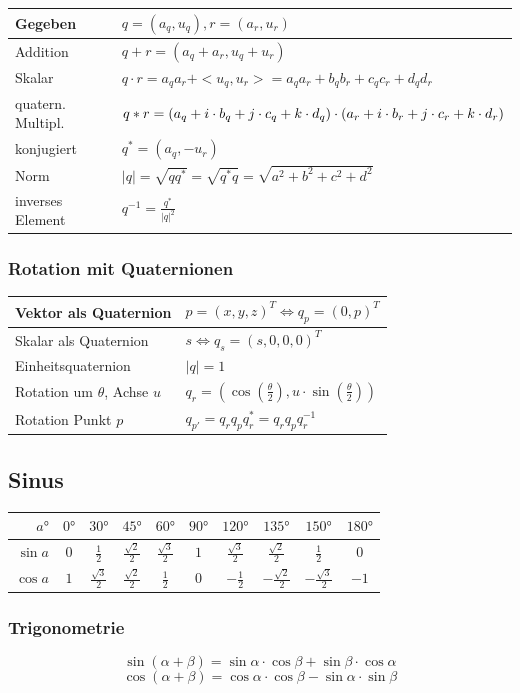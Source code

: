 \documentclass[8pt,a4paper,landscape]{scrartcl}
\begin{document}
\begin{multicols*}{3}
\begin{tabularx}{\columnwidth}{m{}|>{\raggedright\arraybackslash}X}
	Gegeben & $ q = (a_q, u_q), r=(a_r, u_r) $\\ \hline
	Addition & $ q + r = (a_q + a_r, u_q + u_r) $\\ \hline
	Skalar & $ q \cdot r = a_qa_r + <u_q, u_r> = a_qa_r + b_qb_r + c_qc_r +d_qd_r $\\ \hline
	quatern. Multipl. & $  q*r = \newline (a_q+i\cdot b_q + j\cdot c_q + k\cdot d_q)\cdot (a_r + i\cdot b_r + j\cdot c_r + k\cdot d_r) $\\ \hline
	konjugiert & $ q^{*} = (a_q, -u_r) $\\ \hline
	Norm & $ |q| = \sqrt{qq^{*}} = \sqrt{q^{*}q} = \sqrt{a^2+b^2+c^2+d^2} $\\ \hline
	inverses Element & $ q^{-1} = \frac{q^{*}}{|q|^2}$
\end{tabularx}

\subsubsection*{Rotation mit Quaternionen}
\begin{tabularx}{\columnwidth}{l|X}
	Vektor als Quaternion & $ p = (x,y,z)^T \Leftrightarrow q_p = (0, p)^T $\\ \hline
	Skalar als Quaternion & $ s \Leftrightarrow q_s = (s, 0, 0, 0)^T $\\ \hline
	Einheitsquaternion & $ |q| = 1 $\\ \hline
	Rotation um $ \theta $, Achse $ u $ & $ q_r = (\cos(\frac{\theta}{2}), u\cdot\sin(\frac{\theta}{2})) $\\ \hline
	Rotation Punkt $ p $ & $ q_{p'} = q_rq_pq_r^{*} = q_rq_pq_r^{-1} $
\end{tabularx}

\subsection*{Sinus}
\begin{tabularx}{\columnwidth}{r|c|c|c|c|c|c|c|c|c}
	$ a° $ & $ 0° $ & $ 30° $ & $ 45° $ & $ 60° $ & $ 90° $ & $ 120° $ & $ 135° $ & $ 150° $ & $ 180° $ \\ \hline
	$ \sin a$& $ 0 $& $ \frac{1}{2} $& $ \frac{\sqrt{2}}{2} $& $ \frac{\sqrt{3}}{2} $& $ 1 $& $ \frac{\sqrt{3}}{2} $& $ \frac{\sqrt{2}}{2} $& $ \frac{1}{2} $& $ 0 $\\ \hline
	$ \cos a$& $ 1 $& $ \frac{\sqrt{3}}{2} $& $ \frac{\sqrt{2}}{2} $& $ \frac{1}{2} $& $ 0 $& $ -\frac{1}{2} $& $ -\frac{\sqrt{2}}{2} $& $ -\frac{\sqrt{3}}{2} $& $ -1 $
\end{tabularx}

\subsubsection*{Trigonometrie}
$$ \sin(\alpha + \beta) = \sin\alpha \cdot \cos\beta + \sin\beta \cdot \cos\alpha $$
$$ \cos(\alpha + \beta) = \cos\alpha \cdot \cos\beta - \sin\alpha \cdot \sin\beta $$


\end{multicols*}
\end{document}
